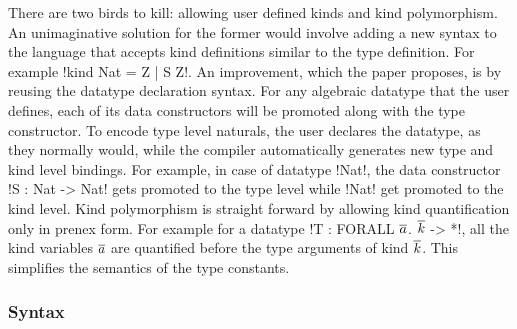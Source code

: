 \documentclass[manuscript,screen,nonacm]{acmart}
\begin{document}
There are two birds to kill: allowing user defined kinds and kind polymorphism. An unimaginative solution for the former would involve adding a new syntax to the language that accepts kind definitions similar to the type definition. For example !kind Nat = Z | S Z!. An improvement, which the paper proposes, is by reusing the datatype declaration syntax. For any algebraic datatype that the user defines, each of its data constructors will be promoted along with the type constructor. To encode type level naturals, the user declares the datatype, as they normally would, while the compiler automatically generates new type and kind level bindings. For example, in case of datatype !Nat!, the data constructor !S : Nat -> Nat! gets promoted to the type level while !Nat! get promoted to the kind level. Kind polymorphism is straight forward by allowing kind quantification only in prenex form. For example for a datatype !T : FORALL $\overline{a}$. $\overline{k}$ -> *!, all the kind variables $\overline{a}$ are quantified before the type arguments of kind $\overline{k}$. This simplifies the semantics of the type constants.

\subsubsection{Syntax}
\end{document}
